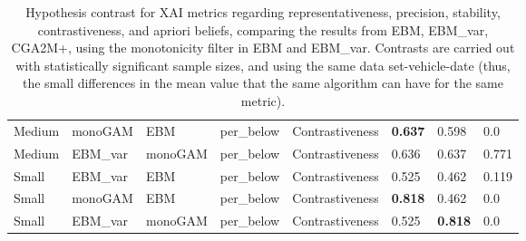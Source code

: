 \begin{table}[]
{\begin{tabular}{@{}llllllll@{}}
Medium & monoGAM        & EBM     & per\_below        & Contrastiveness    & \textbf{0.637} & 0.598          & 0.0   \\
Medium & EBM\_var & monoGAM & per\_below        & Contrastiveness    & 0.636          & 0.637          & 0.771 \\
Small  & EBM\_var & EBM     & per\_below        & Contrastiveness    & 0.525          & 0.462          & 0.119 \\
Small  & monoGAM        & EBM     & per\_below        & Contrastiveness    & \textbf{0.818} & 0.462          & 0.0   \\
Small  & EBM\_var & monoGAM & per\_below        & Contrastiveness    & 0.525          & \textbf{0.818} & 0.0   \\ \bottomrule
\end{tabular}%
}
\caption{Hypothesis contrast for XAI metrics regarding representativeness, precision, stability, contrastiveness, and apriori beliefs, comparing the results from EBM, EBM\_var, CGA2M+, using the monotonicity filter in EBM and EBM\_var. Contrasts are carried out with statistically significant sample sizes, and using the same data set-vehicle-date (thus, the small differences in the mean value that the same algorithm can have for the same metric). }
\label{table:annex-xai-metrics-contrast-mono}
\end{table}




